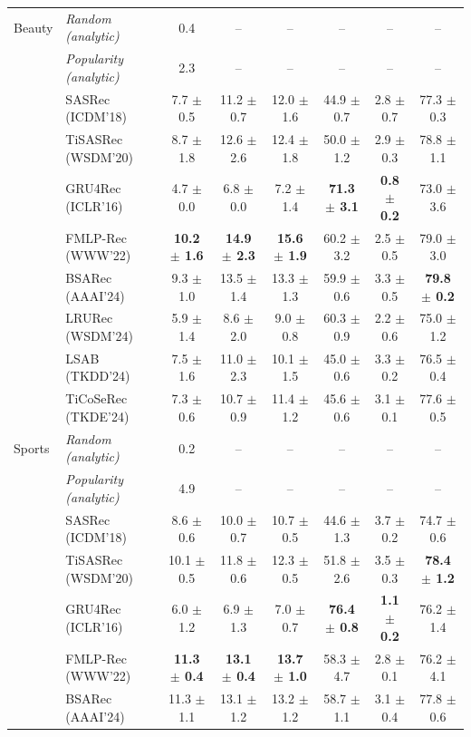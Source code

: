 \begin{table}[!htbp]
\begin{tabular*}{\textwidth}{@{\extracolsep{\fill}}llcccccc@{}}
\midrule
Beauty & \textit{Random (analytic)} & 0.4 & -- & -- & -- & -- & -- \\
 & \textit{Popularity (analytic)} & 2.3 & -- & -- & -- & -- & -- \\
 & SASRec (ICDM'18) & 7.7 $\pm$ 0.5 & 11.2 $\pm$ 0.7 & 12.0 $\pm$ 1.6 & 44.9 $\pm$ 0.7 & 2.8 $\pm$ 0.7 & 77.3 $\pm$ 0.3 \\
 & TiSASRec (WSDM'20) & 8.7 $\pm$ 1.8 & 12.6 $\pm$ 2.6 & 12.4 $\pm$ 1.8 & 50.0 $\pm$ 1.2 & 2.9 $\pm$ 0.3 & 78.8 $\pm$ 1.1 \\
 & GRU4Rec (ICLR'16) & 4.7 $\pm$ 0.0 & 6.8 $\pm$ 0.0 & 7.2 $\pm$ 1.4 & \textbf{71.3 $\pm$ 3.1} & \textbf{0.8 $\pm$ 0.2} & 73.0 $\pm$ 3.6 \\
 & FMLP-Rec (WWW'22) & \textbf{10.2 $\pm$ 1.6} & \textbf{14.9 $\pm$ 2.3} & \textbf{15.6 $\pm$ 1.9} & 60.2 $\pm$ 3.2 & 2.5 $\pm$ 0.5 & 79.0 $\pm$ 3.0 \\
 & BSARec (AAAI'24) & 9.3 $\pm$ 1.0 & 13.5 $\pm$ 1.4 & 13.3 $\pm$ 1.3 & 59.9 $\pm$ 0.6 & 3.3 $\pm$ 0.5 & \textbf{79.8 $\pm$ 0.2} \\
 & LRURec (WSDM'24) & 5.9 $\pm$ 1.4 & 8.6 $\pm$ 2.0 & 9.0 $\pm$ 0.8 & 60.3 $\pm$ 0.9 & 2.2 $\pm$ 0.6 & 75.0 $\pm$ 1.2 \\
 & LSAB (TKDD'24) & 7.5 $\pm$ 1.6 & 11.0 $\pm$ 2.3 & 10.1 $\pm$ 1.5 & 45.0 $\pm$ 0.6 & 3.3 $\pm$ 0.2 & 76.5 $\pm$ 0.4 \\
 & TiCoSeRec (TKDE'24) & 7.3 $\pm$ 0.6 & 10.7 $\pm$ 0.9 & 11.4 $\pm$ 1.2 & 45.6 $\pm$ 0.6 & 3.1 $\pm$ 0.1 & 77.6 $\pm$ 0.5 \\
\midrule
Sports & \textit{Random (analytic)} & 0.2 & -- & -- & -- & -- & -- \\
 & \textit{Popularity (analytic)} & 4.9 & -- & -- & -- & -- & -- \\
 & SASRec (ICDM'18) & 8.6 $\pm$ 0.6 & 10.0 $\pm$ 0.7 & 10.7 $\pm$ 0.5 & 44.6 $\pm$ 1.3 & 3.7 $\pm$ 0.2 & 74.7 $\pm$ 0.6 \\
 & TiSASRec (WSDM'20) & 10.1 $\pm$ 0.5 & 11.8 $\pm$ 0.6 & 12.3 $\pm$ 0.5 & 51.8 $\pm$ 2.6 & 3.5 $\pm$ 0.3 & \textbf{78.4 $\pm$ 1.2} \\
 & GRU4Rec (ICLR'16) & 6.0 $\pm$ 1.2 & 6.9 $\pm$ 1.3 & 7.0 $\pm$ 0.7 & \textbf{76.4 $\pm$ 0.8} & \textbf{1.1 $\pm$ 0.2} & 76.2 $\pm$ 1.4 \\
 & FMLP-Rec (WWW'22) & \textbf{11.3 $\pm$ 0.4} & \textbf{13.1 $\pm$ 0.4} & \textbf{13.7 $\pm$ 1.0} & 58.3 $\pm$ 4.7 & 2.8 $\pm$ 0.1 & 76.2 $\pm$ 4.1 \\
 & BSARec (AAAI'24) & 11.3 $\pm$ 1.1 & 13.1 $\pm$ 1.2 & 13.2 $\pm$ 1.2 & 58.7 $\pm$ 1.1 & 3.1 $\pm$ 0.4 & 77.8 $\pm$ 0.6 \\

\end{tabular*}
\end{table}
